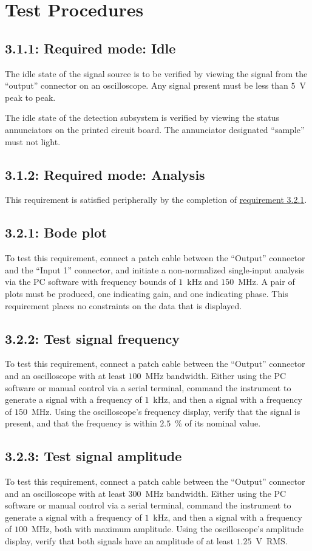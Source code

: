 \chapter{Test Procedures}
\label{chap:test}

\section*{3.1.1: Required mode: Idle}
The idle state of the signal source is to be verified by viewing the signal from the
``output'' connector on an oscilloscope. Any signal present must be less than $5$~V peak to peak.

The idle state of the detection subsystem is verified by viewing the status annunciators on
the printed circuit board. The annunciator designated ``sample'' must not light.


\section*{3.1.2: Required mode: Analysis}
This requirement is satisfied peripherally by the completion of \hyperref[tp:3.2.1]{requirement 3.2.1}.

\section*{3.2.1: Bode plot}
\label{tp:3.2.1}
To test this requirement, connect a patch cable between the ``Output'' connector and the
``Input 1'' connector, and initiate a non-normalized single-input analysis via the PC
software with frequency bounds of $1$~kHz and $150$~MHz. A pair of plots must
be produced, one indicating gain, and one indicating phase. This requirement places no
constraints on the data that is displayed.

\section*{3.2.2: Test signal frequency}
\label{tp:3.2.2}
To test this requirement, connect a patch cable between the ``Output'' connector and an oscilloscope
with at least $100$~MHz bandwidth. Either using the PC software or manual control via a
serial terminal, command the instrument to generate a signal with a frequency of $1$~kHz, and then
a signal with a frequency of $150$~MHz. Using the oscilloscope's frequency display, verify
that the signal is present, and that the frequency is within $2.5$~\% of its nominal value.

\section*{3.2.3: Test signal amplitude}
To test this requirement, connect a patch cable between the ``Output'' connector and an
oscilloscope with at least $300$~MHz bandwidth. Either using the PC software or manual control
via a serial terminal, command the instrument to generate a signal with a frequency of $1$~kHz,
and then a signal with a frequency of $100$~MHz, both with maximum amplitude. Using the
oscilloscope's amplitude display, verify that both signals have an amplitude of at least
$1.25$~V~RMS.

